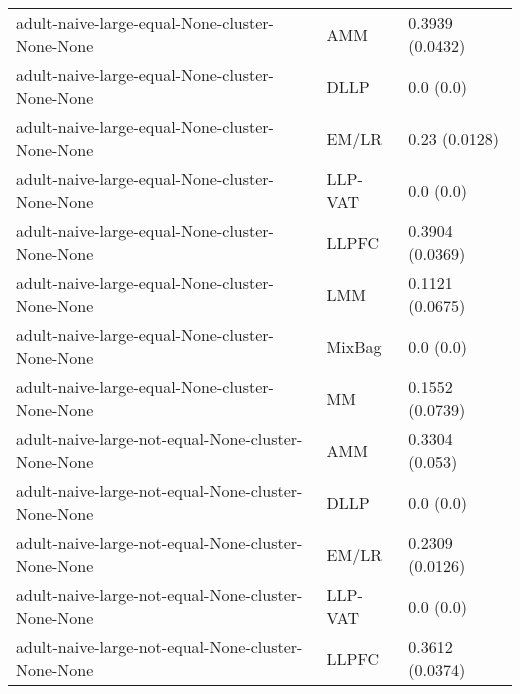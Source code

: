 \begin{longtable}{lll}
                                                               adult-naive-large-equal-None-cluster-None-None &       AMM &                           0.3939 (0.0432) \\
                                                               adult-naive-large-equal-None-cluster-None-None &      DLLP &                                 0.0 (0.0) \\
                                                               adult-naive-large-equal-None-cluster-None-None &     EM/LR &                             0.23 (0.0128) \\
                                                               adult-naive-large-equal-None-cluster-None-None &   LLP-VAT &                                 0.0 (0.0) \\
                                                               adult-naive-large-equal-None-cluster-None-None &     LLPFC &                           0.3904 (0.0369) \\
                                                               adult-naive-large-equal-None-cluster-None-None &       LMM &                           0.1121 (0.0675) \\
                                                               adult-naive-large-equal-None-cluster-None-None &    MixBag &                                 0.0 (0.0) \\
                                                               adult-naive-large-equal-None-cluster-None-None &        MM &                           0.1552 (0.0739) \\
                                                           adult-naive-large-not-equal-None-cluster-None-None &       AMM &                            0.3304 (0.053) \\
                                                           adult-naive-large-not-equal-None-cluster-None-None &      DLLP &                                 0.0 (0.0) \\
                                                           adult-naive-large-not-equal-None-cluster-None-None &     EM/LR &                           0.2309 (0.0126) \\
                                                           adult-naive-large-not-equal-None-cluster-None-None &   LLP-VAT &                                 0.0 (0.0) \\
                                                           adult-naive-large-not-equal-None-cluster-None-None &     LLPFC &                           0.3612 (0.0374) \\

\end{longtable}
